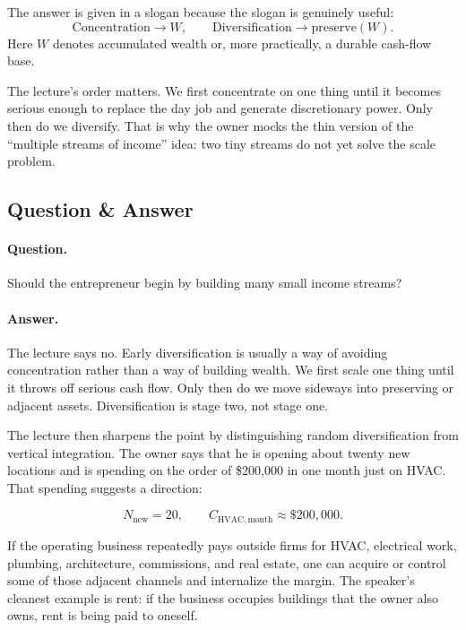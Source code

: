 The answer is given in a slogan because the slogan is genuinely useful:
\begin{equation}
\mathrm{Concentration} \longrightarrow W,
\qquad
\mathrm{Diversification} \longrightarrow \mathrm{preserve}(W).
\end{equation}
Here \(W\) denotes accumulated wealth or, more practically, a durable cash-flow base.

The lecture's order matters. We first concentrate on one thing until it becomes serious enough to replace the day job and generate discretionary power. Only then do we diversify. That is why the owner mocks the thin version of the ``multiple streams of income'' idea: two tiny streams do not yet solve the scale problem.

\subsection{Question \& Answer}

\paragraph{Question.} Should the entrepreneur begin by building many small income streams?

\paragraph{Answer.} The lecture says no. Early diversification is usually a way of avoiding concentration rather than a way of building wealth. We first scale one thing until it throws off serious cash flow. Only then do we move sideways into preserving or adjacent assets. Diversification is stage two, not stage one.

The lecture then sharpens the point by distinguishing random diversification from vertical integration. The owner says that he is opening about twenty new locations and is spending on the order of \$200{,}000 in one month just on HVAC. That spending suggests a direction:

\begin{equation}
N_{\mathrm{new}} = 20,
\qquad
C_{\mathrm{HVAC,month}} \approx \$200{,}000.
\end{equation}

If the operating business repeatedly pays outside firms for HVAC, electrical work, plumbing, architecture, commissions, and real estate, one can acquire or control some of those adjacent channels and internalize the margin. The speaker's cleanest example is rent: if the business occupies buildings that the owner also owns, rent is being paid to oneself.

